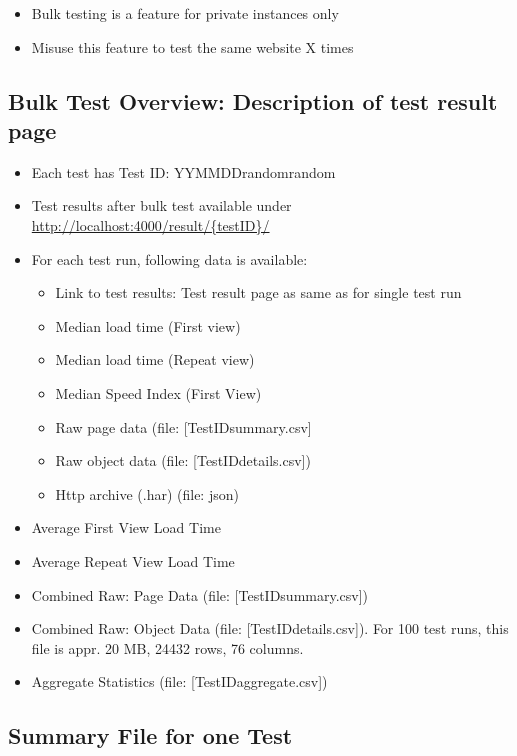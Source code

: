 \begin{itemize}
\item Bulk testing is a feature for private instances only
\item Misuse this feature to test the same website X times
\end{itemize}


\subsection{Bulk Test Overview: Description of test result page}

\begin{itemize}
\item Each test has Test ID: YYMMDD\textunderscore random\textunderscore random
\item Test results after bulk test available under \url{http://localhost:4000/result/{testID}/}
\item For each test run, following data is available:
	\begin{itemize}
	\item Link to test results: Test result page as same as for single test run
	\item Median load time (First view)
	\item Median load time (Repeat view)
	\item Median Speed Index (First View)
	\item Raw page data (file: [TestID\textunderscore summary.csv]
	\item Raw object data (file: [TestID\textunderscore details.csv])
	\item Http archive (.har) (file: json)
	\end{itemize}
	
\item Average First View Load Time
\item Average Repeat View Load Time
\item Combined Raw: Page Data  (file: [TestID\textunderscore summary.csv])
\item Combined Raw: Object Data (file: [TestID\textunderscore details.csv]). For 100 test runs, this file is appr. 20 MB, 24432 rows, 76 columns. 
\item Aggregate Statistics (file: [TestID\textunderscore aggregate.csv])
\end{itemize}


\subsection{Summary File for one Test}

